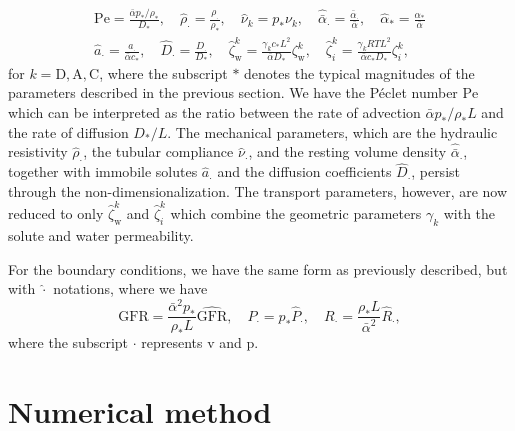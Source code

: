 \documentclass{article}
\begin{document}
\begin{gather}
    \mathrm{Pe} = \frac{\bar{\alpha}p_*/\rho_*}{D_*},\quad \hat{\rho}_\cdot = \frac{\rho_\cdot}{\rho_*},\quad \hat{\nu}_k = p_*\nu_k,\quad \hat{\bar{\alpha}}_\cdot = \frac{\bar{\alpha}_\cdot}{\bar{\alpha}},\quad \hat{\alpha}_* = \frac{\alpha_*}{\bar{\alpha}}\\
    \hat{a}_\cdot = \frac{a_\cdot}{\bar{\alpha}c_*},\quad
    \hat{D}_\cdot = \frac{D_\cdot}{D_*},\quad \hat{\zeta}_\mathrm{w}^k = \frac{\gamma_k c_*L^2}{\bar{\alpha}D_*}\zeta_\mathrm{w}^k,\quad\hat{\zeta}_i^k = \frac{\gamma_kRT L^2}{\bar{\alpha}c_* D_*}\zeta_i^k,
\end{gather}
    for $k=\mathrm{D},\mathrm{A},\mathrm{C}$, where the subscript $*$ denotes the typical magnitudes of the parameters described in the previous section.
We have the P\'eclet number $\mathrm{Pe}$ which can be interpreted as the ratio between the rate of advection $\bar{\alpha}p_*/\rho_*L$ and the rate of diffusion $D_*/L$.
The mechanical parameters, which are the hydraulic resistivity $\hat{\rho}_\cdot$, the tubular compliance $\hat{\nu}_\cdot$, and the resting volume density $\hat{\bar{\alpha}}_\cdot$, together with immobile solutes $\hat{a}_\cdot$ and the diffusion coefficients $\hat{D}_\cdot$, persist through the non-dimensionalization.
The transport parameters, however, are now reduced to only $\hat{\zeta}_\mathrm{w}^k$ and $\hat{\zeta}_i^k$ which combine the geometric parameters $\gamma_k$ with the solute and water permeability.

For the boundary conditions, we have the same form as previously described, but with $\hat{\cdot}$ notations, where we have
\begin{equation}
    \mathrm{GFR} = \frac{\bar{\alpha}^2 p_*}{\rho_* L}\widehat{\mathrm{GFR}},\quad
    P_\cdot = p_*\hat{P}_\cdot,\quad R_\cdot = \frac{\rho_* L}{\bar{\alpha}^2}\hat{R}_\cdot,
\end{equation}
    where the subscript $\cdot$ represents $\mathrm{v}$ and $\mathrm{p}$.

\section{Numerical method}
\end{document}
